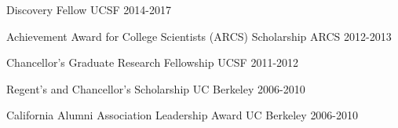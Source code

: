 

\begin{cvhonors}

  \cvhonor
  {} %
  {Discovery Fellow} %
  {UCSF} %
  {2014-2017} %

  \cvhonor
  {} %
  {Achievement Award for College Scientists (ARCS) Scholarship} %
  {ARCS} %
  {2012-2013} %

  \cvhonor
  {} %
  {Chancellor's Graduate Research Fellowship} %
  {UCSF} %
  {2011-2012} %

\end{cvhonors}



\begin{cvhonors}

  \cvhonor
  {} %
  {Regent's and Chancellor's Scholarship} %
  {UC Berkeley} %
  {2006-2010} %

  \cvhonor
  {} %
  {California Alumni Association Leadership Award} %
  {UC Berkeley} %
  {2006-2010} %

\end{cvhonors}
